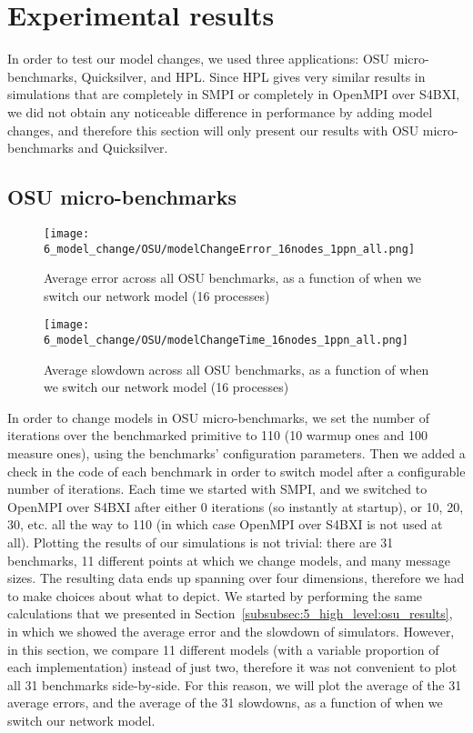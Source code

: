 \section{Experimental results}
\label{sec:6_model_change:experiments}

In order to test our model changes, we used three applications: OSU
micro-benchmarks, Quicksilver, and HPL. Since HPL gives very similar results in
simulations that are completely in SMPI or completely in OpenMPI over S4BXI, we
did not obtain any noticeable difference in performance by adding model changes,
and therefore this section will only present our results with OSU
micro-benchmarks and Quicksilver.

\subsection{OSU micro-benchmarks}

\begin{figure}[!h]
    \centering
    \texttt{[image: 6\_model\_change/OSU/modelChangeError\_16nodes\_1ppn\_all.png]}
    \caption{Average error across all OSU benchmarks, as a function of when we switch our network model (16 processes)}
    \label{fig:6_model_change:osu_16_error}
\end{figure}

\begin{figure}[!h]
    \centering
    \texttt{[image: 6\_model\_change/OSU/modelChangeTime\_16nodes\_1ppn\_all.png]}
    \caption{Average slowdown across all OSU benchmarks, as a function of when we switch our network model (16 processes)}
    \label{fig:6_model_change:osu_16_perf}
\end{figure}

In order to change models in OSU micro-benchmarks, we set the number of
iterations over the benchmarked primitive to 110 (10 warmup ones and 100 measure
ones), using the benchmarks' configuration parameters. Then we added a check in
the code of each benchmark in order to switch model after a configurable number
of iterations. Each time we started with SMPI, and we switched to OpenMPI over
S4BXI after either 0 iterations (so instantly at startup), or 10, 20, 30, etc.
all the way to 110 (in which case OpenMPI over S4BXI is not used at all).
Plotting the results of our simulations is not trivial: there are 31 benchmarks,
11 different points at which we change models, and many message sizes. The
resulting data ends up spanning over four dimensions, therefore we had to make
choices about what to depict. We started by performing the same calculations
that we presented in Section~\ref{subsubsec:5_high_level:osu_results}, in which
we showed the average error and the slowdown of simulators. However, in this
section, we compare 11 different models (with a variable proportion of each
implementation) instead of just two, therefore it was not convenient to plot all
31 benchmarks side-by-side. For this reason, we will plot the average of the 31
average errors, and the average of the 31 slowdowns, as a function of when we
switch our network model.

